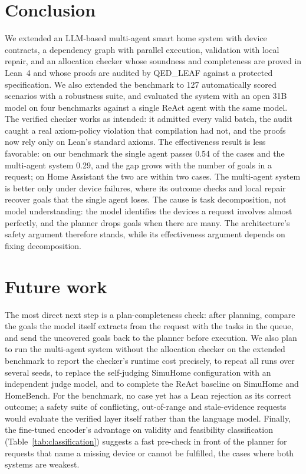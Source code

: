 \documentclass[a4paper,11pt]{article}
\begin{document}
\section{Conclusion}

We extended an LLM-based multi-agent smart home system with device contracts, a dependency graph
with parallel execution, validation with local repair, and an allocation checker whose soundness
and completeness are proved in Lean~4 and whose proofs are audited by QED\_LEAF against a protected
specification. We also extended the benchmark to 127 automatically scored scenarios with a
robustness suite, and evaluated the system with an open 31B model on four benchmarks against a
single ReAct agent with the same model. The verified checker works as intended: it admitted every
valid batch, the audit caught a real axiom-policy violation that compilation had not, and the
proofs now rely only on Lean's standard axioms. The effectiveness result is less favorable: on our
benchmark the single agent passes 0.54 of the cases and the multi-agent system 0.29, and the gap
grows with the number of goals in a request; on Home Assistant the two are within two cases. The
multi-agent system is better only under device failures, where its outcome checks and local repair
recover goals that the single agent loses. The cause is task decomposition, not model
understanding: the model identifies the devices a request involves almost perfectly, and the
planner drops goals when there are many. The architecture's safety argument therefore stands,
while its effectiveness argument depends on fixing decomposition.

\section{Future work}

The most direct next step is a plan-completeness check: after planning, compare the goals the
model itself extracts from the request with the tasks in the queue, and send the uncovered goals
back to the planner before execution. We also plan to run the multi-agent system without the
allocation checker on the extended benchmark to report the checker's runtime cost precisely, to
repeat all runs over several seeds, to replace the self-judging SimuHome configuration with an
independent judge model, and to complete the ReAct baseline on SimuHome and HomeBench. For the
benchmark, no case yet has a Lean rejection as its correct outcome; a safety suite of conflicting,
out-of-range and stale-evidence requests would evaluate the verified layer itself rather than the
language model. Finally, the fine-tuned encoder's advantage on validity and feasibility
classification (Table~\ref{tab:classification}) suggests a fast pre-check in front of the planner
for requests that name a missing device or cannot be fulfilled, the cases where both systems are
weakest.
\end{document}
